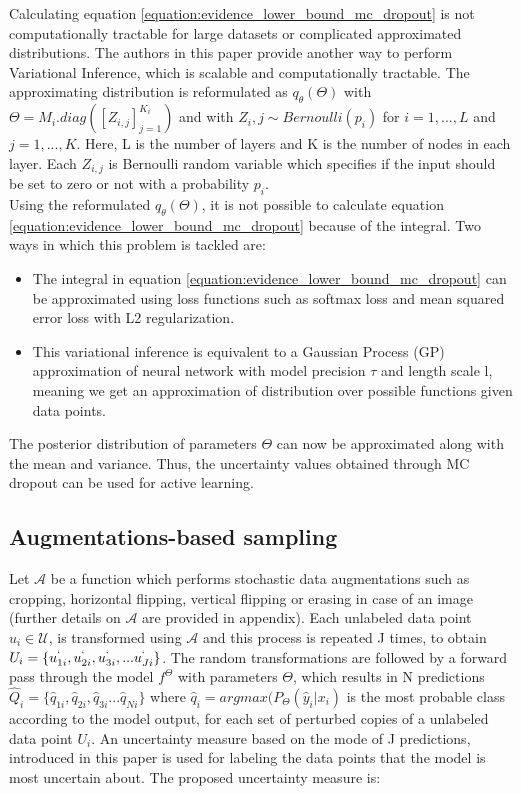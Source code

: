 Calculating equation \ref{equation:evidence_lower_bound_mc_dropout} is not computationally tractable for large datasets or complicated approximated distributions. The authors in this paper provide another way to perform Variational Inference, which is scalable and computationally tractable. The approximating distribution is reformulated as $q_{\theta}(\Theta)$ with $\Theta = M_i . diag([Z_{i, j}]_{j=1}^{K_i})$ and with $Z_i,j \sim Bernoulli(p_i)$ for $i = 1, ...,L$ and $j = 1, ...,K$. Here, L is the number of layers and K is the number of nodes in each layer. Each $Z_{i,j}$ is Bernoulli random variable which specifies if the input should be set to zero or not with a probability $p_i$. \\
Using the reformulated $q_{\theta}(\Theta)$, it is not possible to calculate equation \ref{equation:evidence_lower_bound_mc_dropout} because of the integral. Two ways in which this problem is tackled are:
\begin{itemize}
  \setlength\itemsep{0em}
  \item The integral in equation \ref{equation:evidence_lower_bound_mc_dropout} can be approximated using loss functions such as softmax loss and mean squared error loss with L2 regularization.
  \item This variational inference is equivalent to a Gaussian Process (GP) approximation of neural network with model precision $\tau$ and length scale l, meaning we get an approximation of distribution over possible functions given data points.
\end{itemize}
The posterior distribution of parameters $\Theta$ can now be approximated along with the mean and variance. Thus, the uncertainty values obtained through MC dropout can be used for active learning.

\subsection{Augmentations-based sampling}
Let $\mathcal{A}$ be a function which performs stochastic data augmentations such as cropping, horizontal flipping, vertical flipping or erasing in case of an image (further details on $\mathcal{A}$ are provided in appendix). Each unlabeled data point $u_i\in\mathcal{U}$, is transformed using $\mathcal{A}$ and this process is repeated J times, to obtain $U_i = \{u_{1i}^{`}, u_{2i}^{`}, u^{`}_{3i}, ... u_{Ji}^{`}\}$. The random transformations are followed by a forward pass through the model $f^\Theta$ with parameters $\Theta$, which results in N predictions $\hat{Q}_i = \{\hat{q}_{1i}, \hat{q}_{2i}, \hat{q}_{3i} ... \hat{q}_{Ni}\}$ where $\hat{q}_i = argmax(P_\Theta(\hat{y}_i|x_i)$ is the most probable class according to the model output, for each set of perturbed copies of a unlabeled data point $U_i$. An uncertainty measure based on the mode of J predictions, introduced in this paper\cite{sadafi2019} is used for labeling the data points that the model is most uncertain about. The proposed uncertainty measure is:

